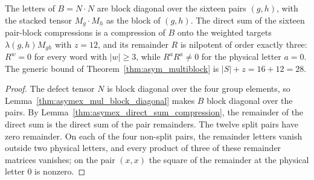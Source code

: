 \begin{lemma}%
    \label{thm:asymex_z2z2_assembled_remainder}
    \leanok
    The letters of $B=N\cdot N$ are block diagonal over the sixteen pairs
    $(g,h)$, with the stacked tensor $M_g\cdot M_h$ as the block of $(g,h)$.
    The direct sum of the sixteen pair-block compressions is a compression
    of $B$ onto the weighted targets $\lambda(g,h)M_{gh}$ with $z=12$, and
    its remainder $R$ is nilpotent of order exactly three: $R^w=0$ for every
    word with $|w|\geq3$, while $R^aR^a\neq0$ for the physical letter
    $a=0$. The generic bound of
    Theorem~\ref{thm:asym_multiblock} is $|S|+z=16+12=28$.
\end{lemma}

\begin{proof}
    \leanok
    The defect tensor $N$ is block diagonal over the four group elements,
    so Lemma~\ref{thm:asymex_mul_block_diagonal} makes $B$ block diagonal
    over the pairs. By Lemma~\ref{thm:asymex_direct_sum_compression}, the
    remainder of the direct sum is the direct sum of the pair remainders.
    The twelve split pairs have zero remainder. On each of the four
    non-split pairs, the remainder letters vanish outside two physical
    letters, and every product of three of these remainder matrices
    vanishes; on the pair $(x,x)$ the square of the remainder at the
    physical letter $0$ is nonzero.
\end{proof}

